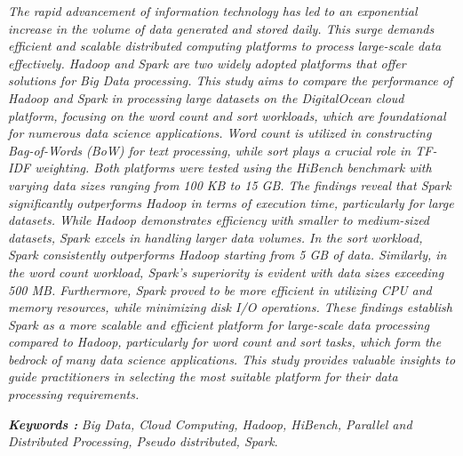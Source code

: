 \begin{abstracteng}
\justifying
\emph{The rapid advancement of information technology has led to an exponential increase in the volume of data generated and stored daily. This surge demands efficient and scalable distributed computing platforms to process large-scale data effectively. Hadoop and Spark are two widely adopted platforms that offer solutions for Big Data processing. This study aims to compare the performance of Hadoop and Spark in processing large datasets on the DigitalOcean cloud platform, focusing on the word count and sort workloads, which are foundational for numerous data science applications. Word count is utilized in constructing Bag-of-Words (BoW) for text processing, while sort plays a crucial role in TF-IDF weighting. Both platforms were tested using the HiBench benchmark with varying data sizes ranging from 100 KB to 15 GB. The findings reveal that Spark significantly outperforms Hadoop in terms of execution time, particularly for large datasets. While Hadoop demonstrates efficiency with smaller to medium-sized datasets, Spark excels in handling larger data volumes. In the sort workload, Spark consistently outperforms Hadoop starting from 5 GB of data. Similarly, in the word count workload, Spark's superiority is evident with data sizes exceeding 500 MB. Furthermore, Spark proved to be more efficient in utilizing CPU and memory resources, while minimizing disk I/O operations. These findings establish Spark as a more scalable and efficient platform for large-scale data processing compared to Hadoop, particularly for word count and sort tasks, which form the bedrock of many data science applications. This study provides valuable insights to guide practitioners in selecting the most suitable platform for their data processing requirements.}

\bigskip
\noindent
\textbf{\emph{Keywords :}} \emph{Big Data, Cloud Computing, Hadoop, HiBench, Parallel and Distributed Processing, Pseudo distributed, Spark}.
\end{abstracteng}
